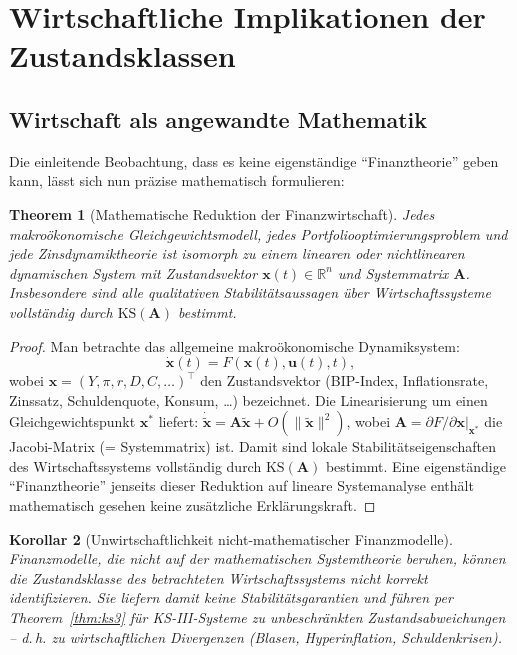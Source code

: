\documentclass[a4paper, 12pt, twoside, openright]{report}
\newtheorem{theorem}{Theorem}[section]
\newtheorem{corollary}[theorem]{Korollar}
\theoremstyle{definition}
\theoremstyle{definition}
\newcommand{\R}{\mathbb{R}}
\newcommand{\vx}{\bm{x}}
\newcommand{\vu}{\bm{u}}
\newcommand{\vA}{\bm{A}}
\newcommand{\T}{\top}
\newcommand{\KS}{\mathrm{KS}}
\begin{document}
\section{Wirtschaftliche Implikationen der Zustandsklassen}
\label{sec:wirtschaft}

\subsection{Wirtschaft als angewandte Mathematik}

Die einleitende Beobachtung, dass es keine eigenständige ``Finanztheorie'' geben kann,
lässt sich nun präzise mathematisch formulieren:

\begin{theorem}[Mathematische Reduktion der Finanzwirtschaft]
\label{thm:finanzreduktion}
Jedes makroökonomische Gleichgewichtsmodell, jedes Portfoliooptimierungs\-problem
und jede Zinsdynamiktheorie ist isomorph zu einem linearen oder nichtlinearen
dynamischen System mit Zustandsvektor $\vx(t) \in \R^n$ und Systemmatrix $\vA$.
Insbesondere sind alle qualitativen Stabilitätsaussagen über Wirtschaftssysteme
vollständig durch $\KS(\vA)$ bestimmt.
\end{theorem}

\begin{proof}
Man betrachte das allgemeine makroökonomische Dynamiksystem:
\begin{equation}
  \dot{\vx}(t) = F(\vx(t), \vu(t), t),
  \label{eq:makrodynamik}
\end{equation}
wobei $\vx = (Y, \pi, r, D, C, \ldots)^\T$ den Zustandsvektor (BIP-Index,
Inflationsrate, Zinssatz, Schuldenquote, Konsum, \ldots) bezeichnet. Die
Linearisierung um einen Gleichgewichtspunkt $\vx^*$ liefert:
$\dot{\tilde{\vx}} = \vA\tilde{\vx} + O(\|\tilde{\vx}\|^2)$, wobei
$\vA = \partial F / \partial \vx\big|_{\vx^*}$ die Jacobi-Matrix (= Systemmatrix)
ist. Damit sind lokale Stabilitätseigenschaften des Wirtschaftssystems vollständig
durch $\KS(\vA)$ bestimmt. Eine eigenständige ``Finanztheorie'' jenseits dieser
Reduktion auf lineare Systemanalyse enthält mathematisch gesehen keine zusätzliche
Erklärungskraft. \qedhere
\end{proof}

\begin{corollary}[Unwirtschaftlichkeit nicht-mathematischer Finanzmodelle]
\label{cor:unwirtschaft}
Finanzmodelle, die nicht auf der mathematischen Systemtheorie beruhen, können die
Zustandsklasse des betrachteten Wirtschaftssystems nicht korrekt identifizieren.
Sie liefern damit keine Stabilitätsgarantien und führen per Theorem~\ref{thm:ks3}
für KS-III-Systeme zu unbeschränkten Zustandsabweichungen -- d.\,h. zu
wirtschaftlichen Divergenzen (Blasen, Hyperinflation, Schuldenkrisen).
\end{corollary}
\end{document}
